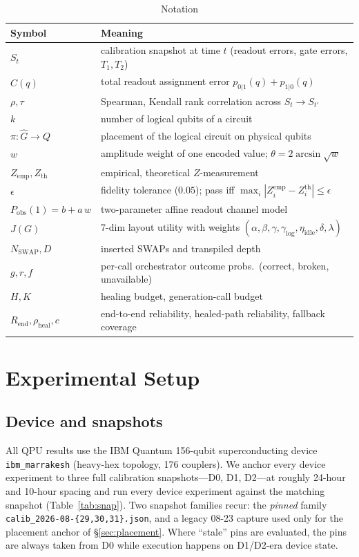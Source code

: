 \documentclass[journal,10pt,twocolumn]{IEEEtran}
\begin{document}
\begin{table}[t]
\caption{Notation}
\label{tab:notation}
\centering
\small
\renewcommand{\arraystretch}{1.15}
\begin{tabular}{@{}lp{5.8cm}@{}}
\toprule
Symbol & Meaning\\
\midrule
$S_t$ & calibration snapshot at time $t$ (readout errors, gate errors, $T_1,T_2$)\\
$C(q)$ & total readout assignment error $p_{0|1}(q)+p_{1|0}(q)$\\
$\rho,\tau$ & Spearman, Kendall rank correlation across $S_t\to S_{t'}$\\
$k$ & number of logical qubits of a circuit\\
$\pi:\hat{G}\to Q$ & placement of the logical circuit on physical qubits\\
$w$ & amplitude weight of one encoded value; $\theta=2\arcsin\sqrt{w}$\\
$Z_{\mathrm{emp}},Z_{\mathrm{th}}$ & empirical, theoretical $Z$-measurement\\
$\epsilon$ & fidelity tolerance ($0.05$); pass iff $\max_i|Z_i^{\mathrm{emp}}-Z_i^{\mathrm{th}}|\le\epsilon$\\
$P_{\mathrm{obs}}(1)=b+a\,w$ & two-parameter affine readout channel model\\
$J(G)$ & 7-dim layout utility with weights $(\alpha,\beta,\gamma,\gamma_{\log},\eta_{\mathrm{idle}},\delta,\lambda)$\\
$N_{\mathrm{SWAP}},D$ & inserted SWAPs and transpiled depth\\
$g,r,f$ & per-call orchestrator outcome probs.\ (correct, broken, unavailable)\\
$H,K$ & healing budget, generation-call budget\\
$R_{\mathrm{end}},\rho_{\mathrm{heal}},c$ & end-to-end reliability, healed-path reliability, fallback coverage\\
\bottomrule
\end{tabular}
\end{table}

\section{Experimental Setup}
\label{sec:setup}
\subsection{Device and snapshots}
All QPU results use the IBM Quantum 156-qubit superconducting device \texttt{ibm\_marrakesh} (heavy-hex
topology, 176 couplers). We anchor every device experiment to three full calibration snapshots---D0, D1,
D2---at roughly 24-hour and 10-hour spacing and run every device experiment against the matching
snapshot (Table~\ref{tab:snap}). Two snapshot families recur: the \emph{pinned} family
\texttt{calib\_2026-08-\{29,30,31\}.json}, and a legacy 08-23 capture used only for the placement
anchor of \S\ref{sec:placement}. Where ``stale'' pins are evaluated, the pins are always taken from
D0 while execution happens on D1/D2-era device state.
\end{document}
